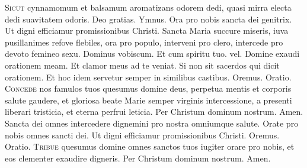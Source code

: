 \begin{multicols*}{2}
\lettrine[lines=2]{\zallmancaps \color{Blue} S}{icut} cynnamomum et balsamum aromatizans odorem dedi, quasi mirra electa dedi suavitatem odoris. Deo gratias. {\color{Red} Ymnus.}
\newline \V Ora pro nobis sancta dei genitrix.
\newline \R Ut digni efficiamur promissionibus Christi.
 Sancta Maria succure miseris, iuva pusillanimes refove flebiles, ora pro populo, interveni pro clero, intercede pro devoto femineo sexu. Dominus vobiscum. Et cum spiritu tuo. {\color{Red} vel.} Domine exaudi orationem meam. Et clamor meus ad te veniat. {\color{Red} Si non sit sacerdos qui dicit orationem. Et hoc idem servetur semper in similibus castibus. Oremus. Oratio.}
\lettrine[lines=2]{\zallmancaps \color{Blue} C}{oncede} nos famulos tuos quesumus domine deus, perpetua mentis et corporis salute gaudere, et gloriosa beate Marie semper virginis intercessione, a presenti liberari tristicia, et eterna perfrui leticia. Per Christum dominum nostrum. Amen.
 Sancta dei omnes intercedere dignemini pro nostra omniumque salute. \V Orate pro nobis omnes sancti dei. \R Ut digni efficiamur promissionibus Christi. Oremus. {\color{Red} Oratio.}
\lettrine[lines=2]{\zallmancaps \color{Red} T}{ribue} quesumus domine omnes sanctos tuos iugiter orare pro nobis, et eos clementer exaudire digneris. Per Christum dominum nostrum. Amen.

\end{multicols*}
